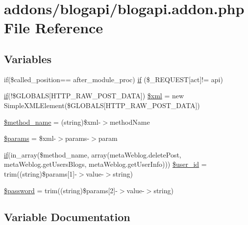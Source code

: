 \hypertarget{blogapi_8addon_8php}{}\section{addons/blogapi/blogapi.addon.\+php File Reference}
\label{blogapi_8addon_8php}
\subsection*{Variables}
\begin{DoxyCompactItemize}
\item 
if(\$called\+\_\+position== \textquotesingle{}after\+\_\+module\+\_\+proc\textquotesingle{}) \hyperlink{blogapi_8addon_8php_ae00067f6d78515f89a86a2a7f42cdc80}{if} (\$\+\_\+\+R\+E\+Q\+U\+E\+S\+T\mbox{[}\textquotesingle{}act\textquotesingle{}\mbox{]}!= \textquotesingle{}api\textquotesingle{})
\item 
\hyperlink{point__level__icon_8addon_8php_a29031816e50a8f742422e671b2bef9b2}{if}(!\$G\+L\+O\+B\+A\+L\+S\mbox{[}\textquotesingle{}H\+T\+T\+P\+\_\+\+R\+A\+W\+\_\+\+P\+O\+S\+T\+\_\+\+D\+A\+T\+A\textquotesingle{}\mbox{]}) \hyperlink{blogapi_8addon_8php_a14ad998c59a6fcbcc09adbc67c7abb85}{\$xml} = new Simple\+X\+M\+L\+Element(\$G\+L\+O\+B\+A\+L\+S\mbox{[}\textquotesingle{}H\+T\+T\+P\+\_\+\+R\+A\+W\+\_\+\+P\+O\+S\+T\+\_\+\+D\+A\+T\+A\textquotesingle{}\mbox{]})
\item 
\hyperlink{blogapi_8addon_8php_a88c34f4701e451bbcef63e44e5902ebd}{\$method\+\_\+name} = (string)\$xml-\/$>$method\+Name
\item 
\hyperlink{blogapi_8addon_8php_afe68e6fbe7acfbffc0af0c84a1996466}{\$params} = \$xml-\/$>$params-\/$>$param
\item 
\hyperlink{point__level__icon_8addon_8php_a29031816e50a8f742422e671b2bef9b2}{if}(in\+\_\+array(\$method\+\_\+name, array(\textquotesingle{}meta\+Weblog.\+delete\+Post\textquotesingle{}, \textquotesingle{}meta\+Weblog.\+get\+Users\+Blogs\textquotesingle{}, \textquotesingle{}meta\+Weblog.\+get\+User\+Info\textquotesingle{}))) \hyperlink{blogapi_8addon_8php_a6d0a036129b3030ce289a026c5e1eff2}{\$user\+\_\+id} = trim((string)\$params\mbox{[}1\mbox{]}-\/$>$value-\/$>$string)
\item 
\hyperlink{blogapi_8addon_8php_a607686ef9f99ea7c42f4f3dd3dbb2b0d}{\$password} = trim((string)\$params\mbox{[}2\mbox{]}-\/$>$value-\/$>$string)
\end{DoxyCompactItemize}


\subsection{Variable Documentation}
\hypertarget{blogapi_8addon_8php_a88c34f4701e451bbcef63e44e5902ebd}{}
